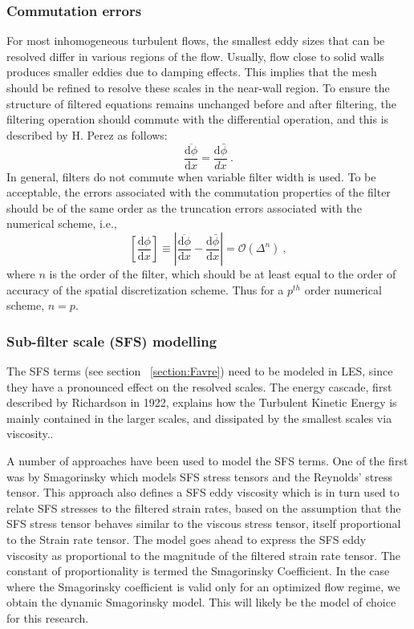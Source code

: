 \subsubsection{Commutation errors} \label{section:commutation_errors}
For most inhomogeneous turbulent flows, the smallest eddy sizes that can be resolved differ in various regions of the flow. Usually, flow close to solid walls  produces smaller eddies due to damping effects. This implies that the mesh should be refined to resolve these scales in the near-wall region. To ensure the structure of filtered equations remains unchanged before and after filtering, the filtering operation should commute with the differential operation, and this is described by H. Perez \cite{HPerez:2011} as follows: 
\begin{equation} 
\overline{\frac{\mathrm{d} \phi}{\mathrm{d} x} } = \frac{\mathrm{d} \bar{\phi}}{dx} \: .
\end{equation}
In general, filters do not commute when variable filter width is used. To be acceptable, the errors associated with the commutation properties of the filter should be of the same order as the truncation errors associated with the numerical scheme, i.e.,
 \begin{equation} \label{eq:commutation_error}
\left[ \frac{\mathrm{d} \phi}{\mathrm{d} x}   \right]  \equiv \left| \overline{\frac{\mathrm{d} \phi}{\mathrm{d} x} } - \frac{\mathrm{d} \bar{\phi}}{\mathrm{d}x}\right| = \mathcal{O}(\Delta^n) \: ,
\end{equation}
 where $n$ is the order of the filter, which should be at least equal to the order of accuracy of the spatial discretization scheme. Thus for a $p^{th}$ order numerical scheme, $n = p$.


\subsubsection{Sub-filter scale (SFS) modelling}
The SFS terms (see section ~\ref{section:Favre}) need to be modeled in LES, since they have a pronounced effect on the resolved scales. The energy cascade, first described by Richardson in 1922, explains how the Turbulent Kinetic Energy is mainly contained in the larger scales, and dissipated by the smallest scales via viscosity.\cite{Pope:2005}.\par
A number of approaches have been used to model the SFS terms. One of the first was by Smagorinsky \cite{Smagorinsky:1963} which models SFS stress tensors and the Reynolds' stress tensor. This approach also defines a SFS eddy viscosity which is in turn used to relate SFS stresses to the filtered strain rates, based on the assumption that the SFS stress tensor behaves similar to the viscous stress tensor, itself proportional to the Strain rate tensor. The model goes ahead to express the SFS eddy viscosity as proportional to the magnitude of the filtered strain rate tensor. The constant of proportionality is termed the Smagorinsky Coefficient. In the case where the Smagorinsky coefficient is valid only for an optimized flow regime, we obtain the dynamic Smagorinsky model. This will likely be the model of choice for this research.